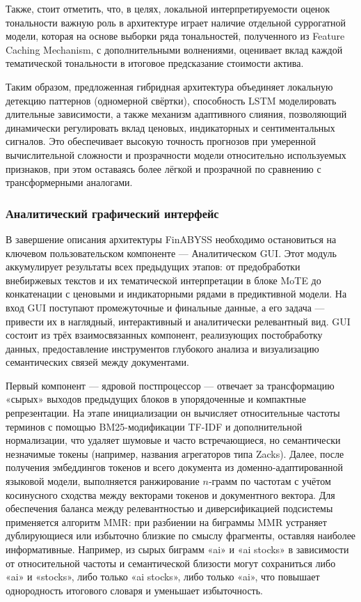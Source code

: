 Также, стоит отметить, что, в целях, локальной интерпретируемости оценок тональности важную роль
в архитектуре играет наличие отдельной суррогатной модели, которая на основе выборки ряда
тональностей, полученного из Feature Caching Mechanism, с дополнительными волнениями,
оценивает вклад каждой тематической тональности в итоговое предсказание стоимости актива.

Таким образом, предложенная гибридная архитектура объединяет локальную детекцию паттернов
(одномерной свёртки), способность LSTM моделировать длительные зависимости, а также механизм
адаптивного слияния, позволяющий динамически регулировать вклад ценовых, индикаторных и сентиментальных
сигналов. Это обеспечивает высокую точность прогнозов при умеренной вычислительной сложности
и прозрачности модели относительно используемых признаков, при этом оставаясь более лёгкой
и прозрачной по сравнению с трансформерными аналогами.

\subsubsection{Аналитический графический интерфейс}
\label{sec:gui}
В завершение описания архитектуры FinABYSS необходимо остановиться на ключевом пользовательском компоненте ---
Аналитическом GUI. Этот модуль аккумулирует результаты всех предыдущих этапов:
от предобработки внебиржевых текстов и их тематической интерпретации в блоке MoTE до конкатенации
с ценовыми и индикаторными рядами в предиктивной модели. На вход GUI поступают промежуточные и финальные данные,
а его задача --- привести их в наглядный, интерактивный и аналитически релевантный вид. GUI состоит
из трёх взаимосвязанных компонент, реализующих постобработку данных, предоставление инструментов
глубокого анализа и визуализацию семантических связей между документами.

Первый компонент --- ядровой постпроцессор --- отвечает за трансформацию «сырых» выходов предыдущих
блоков в упорядоченные и компактные репрезентации. На этапе инициализации он вычисляет относительные
частоты терминов с помощью BM25-модификации TF-IDF и дополнительной нормализации, что удаляет шумовые
и часто встречающиеся, но семантически незначимые токены (например, названия агрегаторов типа Zacks).
Далее, после получения эмбеддингов токенов и всего документа из доменно‑адаптированной языковой модели,
выполняется ранжирование $n$‑грамм по частотам с учётом косинусного сходства между векторами токенов
и документного вектора. Для обеспечения баланса между релевантностью и диверсификацией подсистемы
применяется алгоритм MMR: при разбиении на биграммы MMR устраняет дублирующиеся или избыточно близкие
по смыслу фрагменты, оставляя наиболее информативные. Например, из сырых биграмм «ai» и «ai stocks»
в зависимости от относительной частоты и семантической близости могут сохраниться либо «ai» и «stocks»,
либо только «ai stocks», либо только «ai», что повышает однородность итогового словаря и уменьшает
избыточность.


